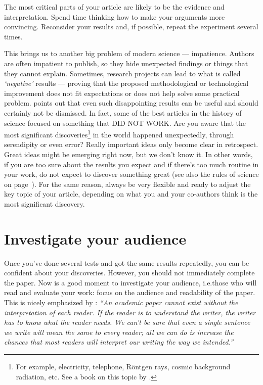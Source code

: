 \documentclass[graybox,envcountchap,sectrefs,UStrade]{svmono}
\begin{document}
\begin{svgraybox}
The most critical parts of your article are likely to be the evidence and interpretation. Spend time thinking how to make your arguments more convincing. Reconsider your results and, if possible, repeat the experiment several times.
\end{svgraybox}

This brings us to another big problem of modern science --- impatience. Authors are often impatient to publish, so they hide unexpected findings or things that they cannot explain. Sometimes, research projects can lead to what is called \emph{`negative'} results --- proving that the proposed methodological or technological improvement does not fit expectations or does not help solve some practical problem. \citet{Creedy2008research} points out that even such disappointing results can be useful and should certainly not be dismissed. In fact, some of the best articles in the history of science focused on something that DID NOT WORK. Are you aware that the most significant discoveries\footnote{For example, electricity, telephone, R\"{o}ntgen rays, cosmic background radiation, etc. See a book on this topic by \citet{Newman2000DM}.} in the world happened unexpectedly, through serendipity or even error? Really important ideas only become clear in retrospect. Great ideas might be emerging right now, but we don't know it. In other words, if you are too sure about the results you expect and if there's too much routine in your work, do not expect to discover something great (see also the rules of science on page~\pageref{F:rules}). For the same reason, always be very flexible and ready to adjust the key topic of your article, depending on what you and your co-authors think is the most significant discovery.\par


 \section{Investigate your audience}

Once you've done several tests and got the same results repeatedly, you can be confident about your discoveries. However, you should not immediately complete the paper. Now is a good moment to investigate your audience, i.e.\@ those who will read and evaluate your work: focus on the audience and readability of the paper. This is nicely emphasized by \citet{Gopen1990}: \emph{``An academic paper cannot exist without the interpretation of each reader. If the reader is to understand the writer, the writer has to know what the reader needs. We can't be sure that even a single sentence we write will mean the same to every reader; all we can do is increase the chances that most readers will interpret our writing the way we intended.''}\par
\end{document}
